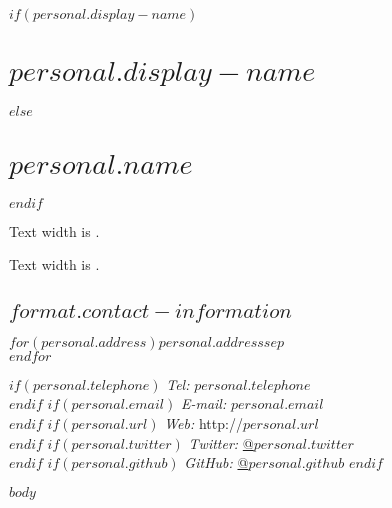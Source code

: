 \documentclass[%
  $if(format.pdf-options.memoir-mode.papersize)$
    $format.pdf-options.memoir-mode.papersize$paper,
  $endif$
  $format.pdf-options.memoir-mode.typesize$,
  oneside
  ]{memoir}
\begin{document}
  $if(personal.display-name)$
    \chapter*{$personal.display-name$}
  $else$
    \chapter*{$personal.name$}
  $endif$

  Text width is \the\textwidth.


  \begin{adjustwidth*}{9em}{0em}
  Text width is \the\textwidth.


  \hypertarget{contact-information}{
  \section{$format.contact-information$}\label{contact-information}}
    \begin{minipage}[t]{0.3\textwidth}
      $for(personal.address)$$personal.address$$sep$\\ $endfor$
    \end{minipage}
    \begin{minipage}[t]{0.7\textwidth}
        $if(personal.telephone)$
        {\textit{Tel:}} $personal.telephone$ \\
        $endif$
        $if(personal.email)$
        {\textit{E-mail:}} $personal.email$ \\
        $endif$
        $if(personal.url)$
        {\textit{Web:}} http://$personal.url$ \\
        $endif$
        $if(personal.twitter)$
        {\textit{Twitter:}} \href{http://twitter.com/$personal.twitter$}{@$personal.twitter$} \\
        $endif$
        $if(personal.github)$
        {\textit{GitHub:}} \href{http://github.com/$personal.github$}{@$personal.github$}
        $endif$
    \end{minipage}
\vspace{-\baselineskip} %
$body$
  \end{adjustwidth*}
\end{document}
